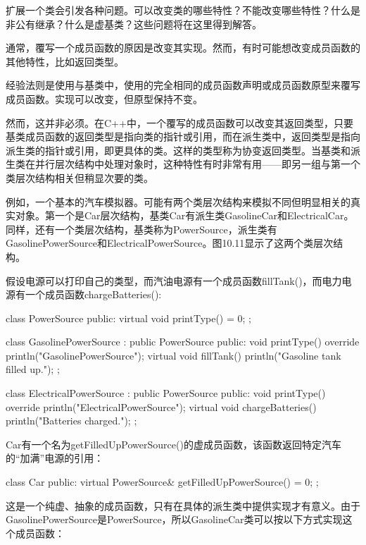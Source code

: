 
扩展一个类会引发各种问题。可以改变类的哪些特性？不能改变哪些特性？什么是非公有继承？什么是虚基类？这些问题将在这里得到解答。


通常，覆写一个成员函数的原因是改变其实现。然而，有时可能想改变成员函数的其他特性，比如返回类型。

经验法则是使用与基类中，使用的完全相同的成员函数声明或成员函数原型来覆写成员函数。实现可以改变，但原型保持不变。

然而，这并非必须。在C++中，一个覆写的成员函数可以改变其返回类型，只要基类成员函数的返回类型是指向类的指针或引用，而在派生类中，返回类型是指向派生类的指针或引用，即更具体的类。这样的类型称为协变返回类型。当基类和派生类在并行层次结构中处理对象时，这种特性有时非常有用——即另一组与第一个类层次结构相关但稍显次要的类。

例如，一个基本的汽车模拟器。可能有两个类层次结构来模拟不同但明显相关的真实对象。第一个是Car层次结构，基类Car有派生类GasolineCar和ElectricalCar。同样，还有一个类层次结构，基类称为PowerSource，派生类有GasolinePowerSource和ElectricalPowerSource。图10.11显示了这两个类层次结构。


假设电源可以打印自己的类型，而汽油电源有一个成员函数fillTank()，而电力电源有一个成员函数chargeBatteries():

\begin{cpp}
class PowerSource
{
    public:
        virtual void printType() = 0;
};

class GasolinePowerSource : public PowerSource
{
    public:
        void printType() override { println("GasolinePowerSource"); }
        virtual void fillTank() { println("Gasoline tank filled up."); }
};

class ElectricalPowerSource : public PowerSource
{
    public:
        void printType() override { println("ElectricalPowerSource"); }
        virtual void chargeBatteries() { println("Batteries charged."); }
};
\end{cpp}

Car有一个名为getFilledUpPowerSource()的虚成员函数，该函数返回特定汽车的“加满”电源的引用：

\begin{cpp}
class Car
{
    public:
        virtual PowerSource& getFilledUpPowerSource() = 0;
};
\end{cpp}

这是一个纯虚、抽象的成员函数，只有在具体的派生类中提供实现才有意义。由于GasolinePowerSource是PowerSource，所以GasolineCar类可以按以下方式实现这个成员函数：

